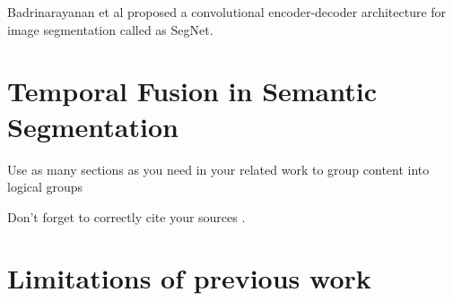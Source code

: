     Badrinarayanan et al proposed a convolutional encoder-decoder architecture for image segmentation called as SegNet. 
    
    
    \section{Temporal Fusion in Semantic Segmentation}
    Use as many sections as you need in your related work to group content into logical groups

    Don't forget to correctly cite your sources \cite{art1}.
    \section{Limitations of previous work}
    


